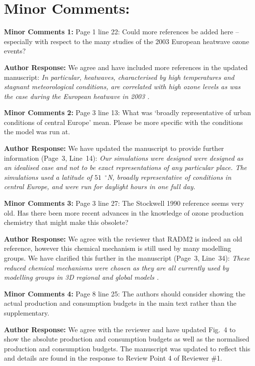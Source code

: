 \documentclass{article}
\DeclareRobustCommand*\degree{\ensuremath{^{\circ}}}
\begin{document}
\section*{Minor Comments:}

\textbf{Minor Comments 1:} Page 1 line 22: Could more references be added here – especially with respect to the many studies of the 2003 European heatwave ozone events?

\textbf{Author Response:} We agree and have included more references in the updated manuscript:
\textit{
In particular, heatwaves, characterised by high temperatures and stagnant meteorological conditions, are correlated with high ozone levels as was the case during the European heatwave in 2003 \citep{Solberg:2008, Vautard:2005}.
} 

\textbf{Minor Comments 2:}  Page 3 line 13: What was ‘broadly representative of urban conditions of central Europe’ mean. Please be more specific with the conditions the model was run at.

\textbf{Author Response:} We have updated the manuscript to provide further information (Page~3, Line~14):
\textit{
Our simulations were designed were designed as an idealised case and not to be exact representations of any particular place.
The simulations used a latitude of $51$~\degree N, broadly representative of conditions in central Europe, and were run for daylight hours in one full day.
}

\textbf{Minor Comments 3:} Page 3 line 27: The Stockwell 1990 reference seems very old. Has there been more recent advances in the knowledge of ozone production chemistry that might make this obsolete?

\textbf{Author Response:} We agree with the reviewer that RADM2 is indeed an old reference, however this chemical mechanism is still used by many modelling groups. We have clarified this further in the manuscript (Page~3, Line~34):
\textit{
These reduced chemical mechanisms were chosen as they are all currently used by modelling groups in 3D regional and global models \citep{Baklanov:2014}.
}

\textbf{Minor Comments 4:}  Page 8 line 25: The authors should consider showing the actual production and consumption budgets in the main text rather than the supplementary.

\textbf{Author Response:} We agree with the reviewer and have updated Fig.~4 to show the absolute production and consumption budgets as well as the normalised production and consumption budgets. The manuscript was updated to reflect this and details are found in the response to Review Point 4 of Reviewer \#1.



\end{document}

